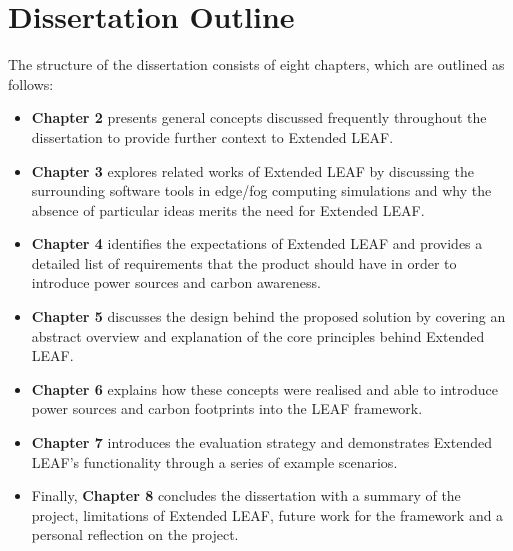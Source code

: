 \documentclass{l4proj}
\begin{document}
\section{Dissertation Outline}
The structure of the dissertation consists of eight chapters, which are outlined as follows:
\begin{itemize}
    \item \textbf{Chapter 2} presents general concepts discussed frequently throughout the dissertation to provide further context to Extended LEAF.
    \item \textbf{Chapter 3} explores related works of Extended LEAF by discussing the surrounding software tools in edge/fog computing simulations and why the absence of particular ideas merits the need for Extended LEAF.
    \item \textbf{Chapter 4} identifies the expectations of Extended LEAF and provides a detailed list of requirements that the product should have in order to introduce power sources and carbon awareness.
    \item \textbf{Chapter 5} discusses the design behind the proposed solution by covering an abstract overview and explanation of the core principles behind Extended LEAF.
    \item \textbf{Chapter 6} explains how these concepts were realised and able to introduce power sources and carbon footprints into the LEAF framework.
    \item \textbf{Chapter 7} introduces the evaluation strategy and demonstrates Extended LEAF's functionality through a series of example scenarios.
    \item Finally, \textbf{Chapter 8} concludes the dissertation with a summary of the project, limitations of Extended LEAF, future work for the framework and a personal reflection on the project.
\end{itemize}
\end{document}
